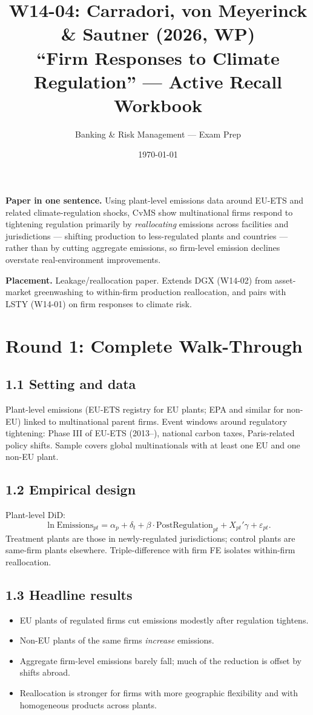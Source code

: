 \documentclass[11pt]{article}
\title{W14-04: Carradori, von Meyerinck \& Sautner (2026, WP) \\
\large ``Firm Responses to Climate Regulation'' --- Active Recall Workbook}
\author{Banking \& Risk Management --- Exam Prep}
\date{\today}
\begin{document}
\maketitle

\begin{keybox}
\textbf{Paper in one sentence.} Using plant-level emissions data around EU-ETS and related climate-regulation shocks, CvMS show multinational firms respond to tightening regulation primarily by \emph{reallocating} emissions across facilities and jurisdictions --- shifting production to less-regulated plants and countries --- rather than by cutting aggregate emissions, so firm-level emission declines overstate real-environment improvements.

\textbf{Placement.} Leakage/reallocation paper. Extends DGX (W14-02) from asset-market greenwashing to within-firm production reallocation, and pairs with LSTY (W14-01) on firm responses to climate risk.
\end{keybox}

\section*{Round 1: Complete Walk-Through}

\subsection*{1.1 Setting and data}
Plant-level emissions (EU-ETS registry for EU plants; EPA and similar for non-EU) linked to multinational parent firms. Event windows around regulatory tightening: Phase III of EU-ETS (2013--), national carbon taxes, Paris-related policy shifts. Sample covers global multinationals with at least one EU and one non-EU plant.

\subsection*{1.2 Empirical design}
Plant-level DiD:
\[
\ln\text{Emissions}_{pt}=\alpha_p+\delta_t+\beta\cdot\text{PostRegulation}_{pt}+X_{pt}'\gamma+\varepsilon_{pt}.
\]
Treatment plants are those in newly-regulated jurisdictions; control plants are same-firm plants elsewhere. Triple-difference with firm FE isolates within-firm reallocation.

\subsection*{1.3 Headline results}
\begin{itemize}
\item EU plants of regulated firms cut emissions modestly after regulation tightens.
\item Non-EU plants of the same firms \emph{increase} emissions.
\item Aggregate firm-level emissions barely fall; much of the reduction is offset by shifts abroad.
\item Reallocation is stronger for firms with more geographic flexibility and with homogeneous products across plants.
\end{itemize}
\end{document}

